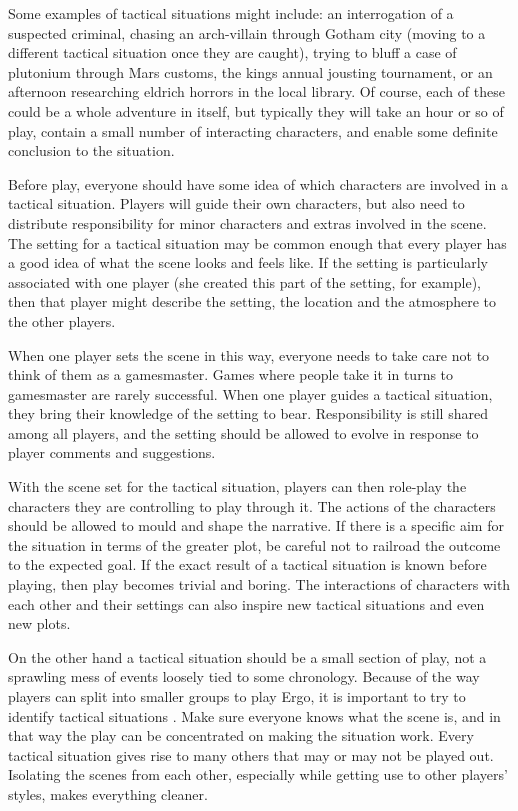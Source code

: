 \documentclass[twoside]{book}
\begin{document}
Some examples of tactical situations might include: an interrogation
of a suspected criminal, chasing an arch-villain through Gotham city
(moving to a different tactical situation once they are caught),
trying to bluff a case of plutonium through Mars customs, the kings
annual jousting tournament, or an afternoon researching eldrich
horrors in the local library. Of course, each of these could be a
whole adventure in itself, but typically they will take an hour or so
of play, contain a small number of interacting characters, and enable
some definite conclusion to the situation.

Before play, everyone should have some idea of which characters are
involved in a tactical situation. Players will guide their own
characters, but also need to distribute responsibility for minor
characters and extras involved in the scene. The setting for a
tactical situation may be common enough that every player has a good
idea of what the scene looks and feels like. If the setting is
particularly associated with one player (she created this part of the
setting, for example), then that player might describe the setting,
the location and the atmosphere to the other players.

When one player sets the scene in this way, everyone needs to take
care not to think of them as a gamesmaster. Games where people take it
in turns to gamesmaster are rarely successful. When one player guides
a tactical situation, they bring their knowledge of the setting to
bear. Responsibility is still shared among all players, and the
setting should be allowed to evolve in response to player comments and
suggestions.

With the scene set for the tactical situation, players can then
role-play the characters they are controlling to play through it. The
actions of the characters should be allowed to mould and shape the
narrative. If there is a specific aim for the situation in terms of
the greater plot, be careful not to railroad the outcome to the
expected goal. If the exact result of a tactical situation is known
before playing, then play becomes trivial and boring. The interactions
of characters with each other and their settings can also inspire new
tactical situations and even new plots.

On the other hand a tactical situation should be a small section of
play, not a sprawling mess of events loosely tied to some
chronology. Because of the way players can split into smaller groups
to play Ergo, it is important to try to identify tactical situations
. Make sure everyone knows what the scene is, and in that way the play
can be concentrated on making the situation work. Every tactical
situation gives rise to many others that may or may not be played
out. Isolating the scenes from each other, especially while getting
use to other players' styles, makes everything cleaner.
\end{document}
